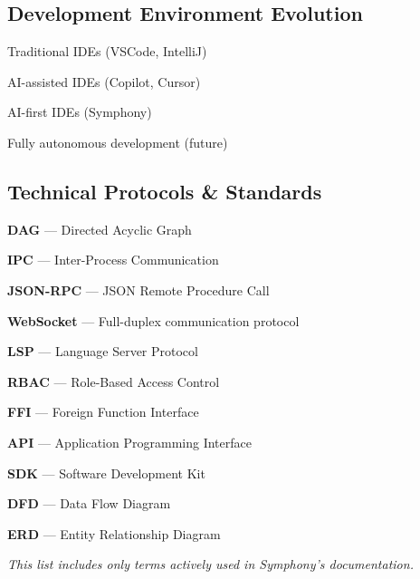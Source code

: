 \subsection*{Development Environment Evolution}
\begin{description}[leftmargin=3.5cm,labelwidth=3cm,labelsep=0.5cm,itemsep=3pt]
\item[\textbf{Wave 1}] Traditional IDEs (VSCode, IntelliJ)
\item[\textbf{Wave 1.5}] AI-assisted IDEs (Copilot, Cursor)
\item[\textbf{Wave 2}] AI-first IDEs (Symphony)
\item[\textbf{Wave 3}] Fully autonomous development (future)
\end{description}


\subsection*{Technical Protocols \& Standards}
\begin{compactlist}
\item \textbf{DAG} — Directed Acyclic Graph
\item \textbf{IPC} — Inter-Process Communication
\item \textbf{JSON-RPC} — JSON Remote Procedure Call
\item \textbf{WebSocket} — Full-duplex communication protocol
\item \textbf{LSP} — Language Server Protocol
\item \textbf{RBAC} — Role-Based Access Control
\item \textbf{FFI} — Foreign Function Interface
\item \textbf{API} — Application Programming Interface
\item \textbf{SDK} — Software Development Kit
\item \textbf{DFD} — Data Flow Diagram
\item \textbf{ERD} — Entity Relationship Diagram
\end{compactlist}


\vspace{0.5cm}
\begin{center}
\textit{This list includes only terms actively used in Symphony's documentation.}
\end{center}

\clearpage
